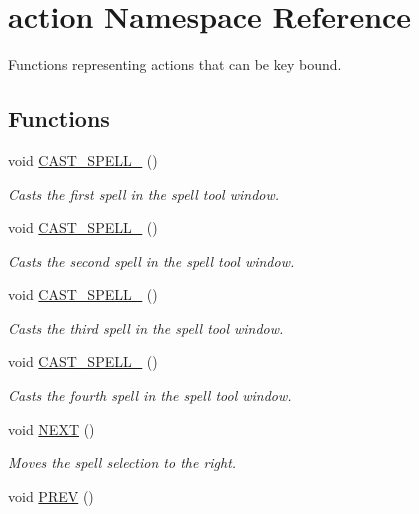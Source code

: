\hypertarget{namespaceaction}{}\section{action Namespace Reference}
\label{namespaceaction}


Functions representing actions that can be key bound.  


\subsection*{Functions}
\begin{DoxyCompactItemize}
\item 
void \hyperlink{namespaceaction_a53d88334072e668c91afc5264f1e0d0b}{C\+A\+S\+T\+\_\+\+S\+P\+E\+L\+L\+\_} ()
\begin{DoxyCompactList}\small\item\em Casts the first spell in the spell tool window. \end{DoxyCompactList}\item 
void \hyperlink{namespaceaction_a41b558a44a12212561ae7802471afe4e}{C\+A\+S\+T\+\_\+\+S\+P\+E\+L\+L\+\_} ()
\begin{DoxyCompactList}\small\item\em Casts the second spell in the spell tool window. \end{DoxyCompactList}\item 
void \hyperlink{namespaceaction_a485d9dbf4eaa4f2263a865e8031b74ad}{C\+A\+S\+T\+\_\+\+S\+P\+E\+L\+L\+\_} ()
\begin{DoxyCompactList}\small\item\em Casts the third spell in the spell tool window. \end{DoxyCompactList}\item 
void \hyperlink{namespaceaction_ae6e32e6d4f806e99f9471675c27345f4}{C\+A\+S\+T\+\_\+\+S\+P\+E\+L\+L\+\_} ()
\begin{DoxyCompactList}\small\item\em Casts the fourth spell in the spell tool window. \end{DoxyCompactList}\item 
void \hyperlink{namespaceaction_a1869fe055f1b3a085f462e4bfd8caf19}{N\+E\+XT} ()
\begin{DoxyCompactList}\small\item\em Moves the spell selection to the right. \end{DoxyCompactList}\item 
void \hyperlink{namespaceaction_a4caa1f3dc4b8efe3e62f791567bb99b7}{P\+R\+EV} ()

\end{DoxyCompactItemize}
